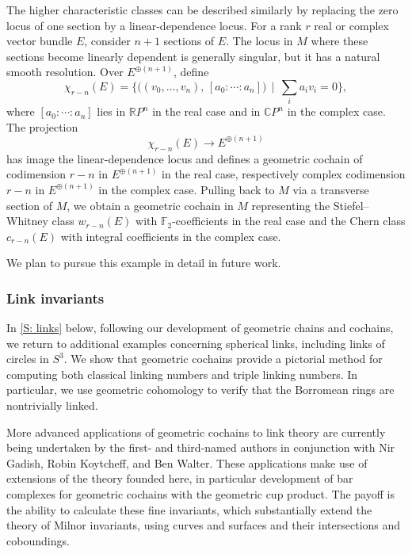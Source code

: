 The higher characteristic classes can be described similarly by replacing the zero locus of one section by a linear-dependence locus.
For a rank $r$ real or complex vector bundle $E$, consider $n+1$ sections of $E$.
The locus in $M$ where these sections become linearly dependent is generally singular, but it has a natural smooth resolution.
Over $E^{\oplus(n+1)}$, define
\[
\chi_{r-n}(E) =
\Big\{ \big((v_0,\ldots,v_n),\, [a_0:\cdots:a_n]\big) \,\mid\, \textstyle \sum_i a_i v_i = 0 \Big\},
\]
where $[a_0:\cdots:a_n]$ lies in $\mathbb{R}P^n$ in the real case and in $\mathbb{C}P^n$ in the complex case.
The projection
\[
\chi_{r-n}(E) \to E^{\oplus(n+1)}
\]
has image the linear-dependence locus and defines a geometric cochain of codimension $r-n$ in $E^{\oplus(n+1)}$ in the real case, respectively complex codimension $r-n$ in $E^{\oplus(n+1)}$ in the complex case.
Pulling back to $M$ via a transverse section of $M$, we obtain a geometric cochain in $M$ representing the Stiefel--Whitney class $w_{r-n}(E)$ with $\mathbb{F}_2$-coefficients in the real case and the Chern class $c_{r-n}(E)$ with integral coefficients in the complex case.

We plan to pursue this example in detail in future work.

\subsubsection{Link invariants}

In \cref{S: links} below, following our development of geometric chains and cochains, we return to additional examples concerning spherical links, including links of circles in $S^3$.
We show that geometric cochains provide a pictorial method for computing both classical linking numbers and triple linking numbers.
In particular, we use geometric cohomology to verify that the Borromean rings are nontrivially linked.

More advanced applications of geometric cochains to link theory are currently being undertaken by the first- and third-named authors in conjunction with Nir Gadish, Robin Koytcheff, and Ben Walter.
These applications make use of extensions of the theory founded here, in particular development of bar complexes for geometric cochains with the geometric cup product.
The payoff is the ability to calculate these fine invariants, which substantially extend the theory of Milnor invariants, using curves and surfaces and their intersections and coboundings.
